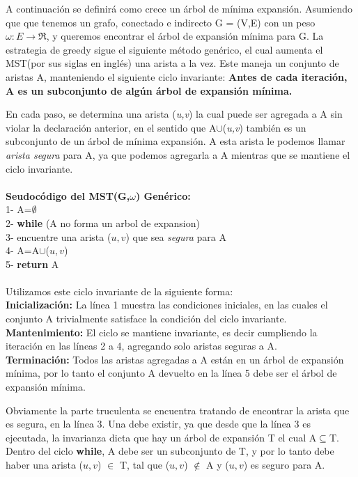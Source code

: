 \documentclass[a4paper, 11pt]{report}
\begin{document}
A continuación se definirá como crece un árbol de mínima expansión. Asumiendo que que tenemos un grafo, conectado e indirecto G = (V,E) con un peso $\omega: E \longrightarrow  \Re$, y queremos encontrar el árbol de expansión mínima para G. La estrategia de greedy sigue el siguiente método genérico, el cual aumenta el MST(por sus siglas en inglés) una arista a la vez. Este maneja un conjunto de aristas A, manteniendo el siguiente ciclo invariante: \textbf{Antes de cada iteración, A es un subconjunto de algún árbol de expansión mínima.}

En cada paso, se determina una arista (\textit{u,v}) la cual puede ser agregada a A sin violar la declaración anterior, en el sentido que A$\cup${(\textit{u,v})} también es un subconjunto de un árbol de mínima expansión. A esta arista le podemos llamar \textit{arista segura} para A, ya que podemos agregarla a A mientras que se mantiene el ciclo invariante.\\ \\
\textbf{Seudocódigo del MST(G,$ \omega$) Genérico: }\\
1- A=$ \emptyset$\\
2- \textbf{while} (A no forma un arbol de expansion)\\
3- 	\indent	encuentre una arista ($u,v$) que sea \textit{segura} para A\\ 4- 	\indent	A=A$\cup${($u,v$)}\\
5- \textbf{return} A\\
\\
Utilizamos este ciclo invariante de la siguiente forma:
\\
\textbf{Inicialización:} La línea 1 muestra las condiciones iniciales, en las cuales el conjunto A trivialmente satisface la condición del ciclo invariante.  \\
\textbf{Mantenimiento:} El ciclo se mantiene invariante, es decir cumpliendo la iteración en las líneas 2 a 4, agregando solo aristas seguras a A.\\
\textbf{Terminación:} Todos las aristas agregadas a A están en un árbol de expansión mínima, por lo tanto el conjunto A devuelto en la línea 5 debe ser el árbol de expansión mínima.

Obviamente la parte truculenta se encuentra tratando de encontrar la arista que es segura, en la línea 3. Una debe existir, ya que desde que la línea 3 es ejecutada, la invarianza dicta que hay un árbol de expansión T el cual A$ \subseteq $T. Dentro del ciclo \textbf{while}, A debe ser un subconjunto de T, y por lo tanto debe haber una arista ($u,v$) $ \in $ T, tal que ($u, v$) $\notin$ A y ($u, v$) es seguro para A.
\end{document}
